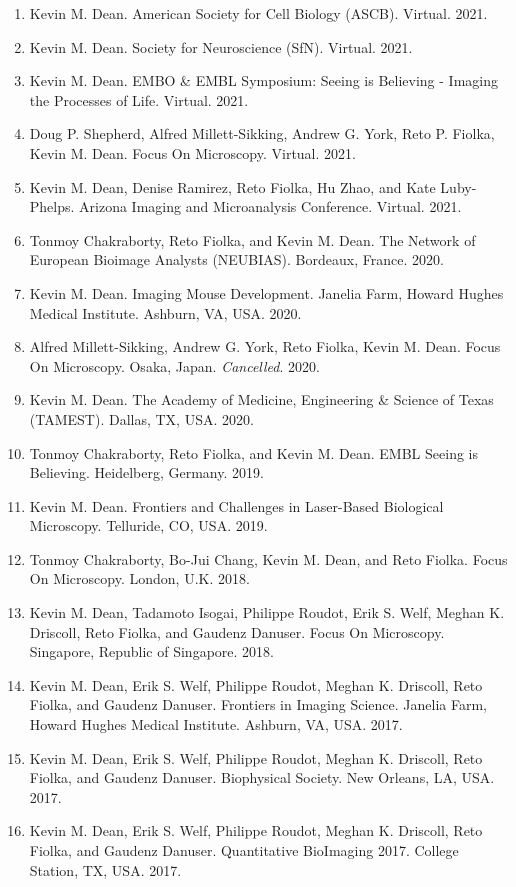 \begin{enumerate}
\item Kevin M. Dean.  American Society for Cell Biology (ASCB). Virtual. 2021.
\item Kevin M. Dean.  Society for Neuroscience (SfN). Virtual. 2021.
\item Kevin M. Dean.  EMBO \& EMBL Symposium: Seeing is Believing - Imaging the Processes of Life.  Virtual.  2021.
\item Doug P. Shepherd, Alfred Millett-Sikking, Andrew G. York, Reto P. Fiolka, Kevin M. Dean.  Focus On Microscopy. Virtual. 2021.
\item Kevin M. Dean, Denise Ramirez, Reto Fiolka, Hu Zhao, and Kate Luby-Phelps. Arizona Imaging and Microanalysis Conference. Virtual. 2021.
\item Tonmoy Chakraborty, Reto Fiolka, and Kevin M. Dean.  The Network of European Bioimage Analysts (NEUBIAS).  Bordeaux, France. 2020.
\item Kevin M. Dean.  Imaging Mouse Development.  Janelia Farm, Howard Hughes Medical Institute.  Ashburn, VA, USA. 2020.
\item Alfred Millett-Sikking, Andrew G. York, Reto Fiolka, Kevin M. Dean.  Focus On Microscopy.  Osaka, Japan. {\it Cancelled}. 2020.
\item Kevin M. Dean.  The Academy of Medicine, Engineering \& Science of Texas (TAMEST).  Dallas, TX, USA. 2020.
\item Tonmoy Chakraborty, Reto Fiolka, and Kevin M. Dean.  EMBL Seeing is Believing. Heidelberg, Germany. 2019.
\item Kevin M. Dean. Frontiers and Challenges in Laser-Based Biological Microscopy. Telluride, CO, USA. 2019.
\item Tonmoy Chakraborty, Bo-Jui Chang, Kevin M. Dean, and Reto Fiolka.  Focus On Microscopy.  London, U.K.  2018.
\item Kevin M. Dean, Tadamoto Isogai, Philippe Roudot, Erik S. Welf, Meghan K. Driscoll, Reto Fiolka, and Gaudenz Danuser.  Focus On Microscopy.  Singapore, Republic of Singapore. 2018.
\item Kevin M. Dean, Erik S. Welf, Philippe Roudot, Meghan K. Driscoll, Reto Fiolka, and Gaudenz Danuser.  Frontiers in Imaging Science.  Janelia Farm, Howard Hughes Medical Institute.  Ashburn, VA, USA.  2017.
\item Kevin M. Dean, Erik S. Welf, Philippe Roudot, Meghan K. Driscoll, Reto Fiolka, and Gaudenz Danuser.  Biophysical Society.  New Orleans, LA, USA. 2017.
\item Kevin M. Dean, Erik S. Welf, Philippe Roudot, Meghan K. Driscoll, Reto Fiolka, and Gaudenz Danuser.  Quantitative BioImaging 2017.  College Station, TX, USA. 2017.

\end{enumerate}
